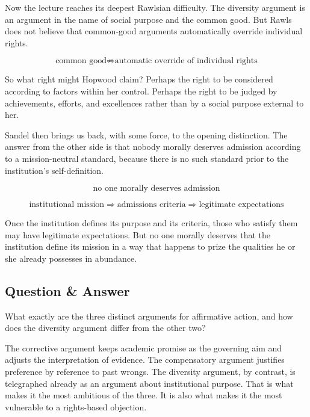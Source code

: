 Now the lecture reaches its deepest Rawlsian difficulty. The diversity argument is an argument in the name of social purpose and the common good. But Rawls does not believe that common-good arguments automatically override individual rights.

\begin{equation}
\text{common good} \not\Longrightarrow \text{automatic override of individual rights}
\end{equation}

So what right might Hopwood claim? Perhaps the right to be considered according to factors within her control. Perhaps the right to be judged by achievements, efforts, and excellences rather than by a social purpose external to her.

Sandel then brings us back, with some force, to the opening distinction. The answer from the other side is that nobody morally deserves admission according to a mission-neutral standard, because there is no such standard prior to the institution's self-definition.

\begin{equation}
\text{no one morally deserves admission}
\end{equation}

\begin{equation}
\text{institutional mission}
\Longrightarrow
\text{admissions criteria}
\Longrightarrow
\text{legitimate expectations}
\end{equation}

Once the institution defines its purpose and its criteria, those who satisfy them may have legitimate expectations. But no one morally deserves that the institution define its mission in a way that happens to prize the qualities he or she already possesses in abundance.

\subsection{Question \& Answer}

What exactly are the three distinct arguments for affirmative action, and how does the diversity argument differ from the other two?

The corrective argument keeps academic promise as the governing aim and adjusts the interpretation of evidence. The compensatory argument justifies preference by reference to past wrongs. The diversity argument, by contrast, is telegraphed already as an argument about institutional purpose. That is what makes it the most ambitious of the three. It is also what makes it the most vulnerable to a rights-based objection.

